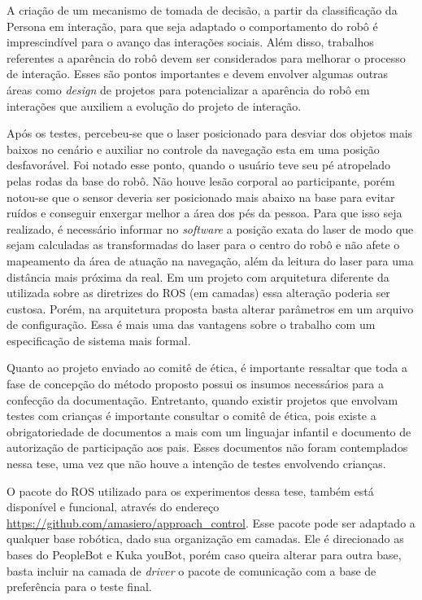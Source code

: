 A criação de um mecanismo de tomada de decisão, a partir da classificação da Persona em interação, para que seja adaptado o comportamento do robô é imprescindível para o avanço das interações sociais. Além disso, trabalhos referentes a aparência do robô devem ser considerados para melhorar o processo de interação. Esses são pontos importantes e devem envolver algumas outras áreas como \textit{design} de projetos para potencializar a aparência do robô em interações que auxiliem a evolução do projeto de interação.

Após os testes, percebeu-se que o laser posicionado para desviar dos objetos mais baixos no cenário e auxiliar no controle da navegação esta em uma posição desfavorável. Foi notado esse ponto, quando o usuário teve seu pé atropelado pelas rodas da base do robô. Não houve lesão corporal ao participante, porém notou-se que o sensor deveria ser posicionado mais abaixo na base para evitar ruídos e conseguir enxergar melhor a área dos pés da pessoa. Para que isso seja realizado, é necessário informar no \textit{software} a posição exata do laser de modo que sejam calculadas as transformadas do laser para o centro do robô e não afete o mapeamento da área de atuação na navegação, além da leitura do laser para uma distância mais próxima da real. Em um projeto com arquitetura diferente da utilizada sobre as diretrizes do ROS (em camadas) essa alteração poderia ser custosa. Porém, na arquitetura proposta basta alterar parâmetros em um arquivo de configuração. Essa é mais uma das vantagens sobre o trabalho com um especificação de sistema mais formal.

Quanto ao projeto enviado ao comitê de ética, é importante ressaltar que toda a fase de concepção do método proposto possui os insumos necessários para a confecção da documentação. Entretanto, quando existir projetos que envolvam testes com crianças é importante consultar o comitê de ética, pois existe a obrigatoriedade de documentos a mais com um linguajar infantil e documento de autorização de participação aos pais. Esses documentos não foram contemplados nessa tese, uma vez que não houve a intenção de testes envolvendo crianças.

O pacote do ROS utilizado para os experimentos dessa tese, também está disponível e funcional, através do endereço \url{https://github.com/amasiero/approach\_control}. Esse pacote pode ser adaptado a qualquer base robótica, dado sua organização em camadas. Ele é direcionado as bases do PeopleBot e Kuka youBot, porém caso queira alterar para outra base, basta incluir na camada de \textit{driver} o pacote de comunicação com a base de preferência para o teste final.

